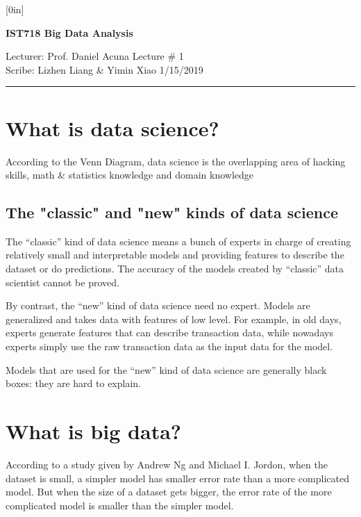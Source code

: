 \documentclass[11pt]{article}
\begin{document}
\thispagestyle{empty}

\raisebox{0.6in}[0in]{}
\vspace{-0.7in}

\begin{center}
\bf\large IST718 Big Data Analysis
\end{center}

\noindent
Lecturer:                Prof. Daniel Acuna
\hfill
Lecture \#               1
\\
Scribe:                  Lizhen Liang \& Yimin Xiao
\hfill
                         1/15/2019

\noindent
\rule{\textwidth}{1pt}

\medskip

\section{What is data science?}
According to the Venn Diagram, data science is the overlapping area of hacking skills, math \& statistics knowledge and domain knowledge

\subsection{The "classic" and "new" kinds of data science}

The “classic” kind of data science means a bunch of experts in charge of creating relatively small and interpretable models and providing features to describe the dataset or do predictions. The accuracy of the models created by “classic” data scientist cannot be proved.

By contrast, the “new” kind of data science need no expert. Models are generalized and takes data with features of low level. For example, in old days, experts generate features that can describe transaction data, while nowadays experts simply use the raw transaction data as the input data for the model.

Models that are used for the “new” kind of data science are generally black boxes: they are hard to explain.

\section{What is big data?}
According to a study given by Andrew Ng and Michael I. Jordon, when the dataset is small, a simpler model has smaller error rate than a more complicated model. But when the size of a dataset gets bigger, the error rate of the more complicated model is smaller than the simpler model.
\end{document}

